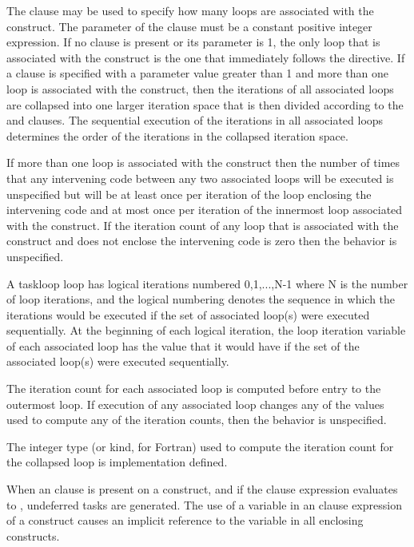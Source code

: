 The  clause may be used to specify how many loops are
associated with the  construct.  The parameter of the
 clause must be a constant positive integer
expression.  If no  clause is present or its parameter
is 1, the only loop that is associated with the 
construct is the one that immediately follows the 
directive.  If a  clause is specified with a parameter
value greater than 1 and more than one loop is associated with the
 construct, then the iterations of all associated loops
are collapsed into one larger iteration space that is then divided
according to the  and  clauses. The
sequential execution of the iterations in all associated loops
determines the order of the iterations in the collapsed iteration
space.

If more than one loop is associated with the  construct
then the number of times that any intervening code between any two
associated loops will be executed is unspecified but will be at least
once per iteration of the loop enclosing the intervening code and at
most once per iteration of the innermost loop associated with the
construct.  If the iteration count of any loop that is associated with the
 construct and does not enclose the intervening code is zero
then the behavior is unspecified.


A taskloop loop has logical iterations numbered 0,1,...,N-1 where N is
the number of loop iterations, and the logical numbering denotes the
sequence in which the iterations would be executed if the set of
associated loop(s) were executed sequentially.  At the beginning of
each logical iteration, the loop iteration variable of each associated
loop has the value that it would have if the set of the associated
loop(s) were executed sequentially.

The iteration count for each associated loop is computed before entry to the outermost loop. If execution of any associated loop changes any of the values used to compute any of the iteration counts, then the behavior is unspecified.

The integer type (or kind, for Fortran) used to compute the iteration count for the collapsed loop is implementation defined.

When an  clause is present on a  construct, and if the  clause expression evaluates to , undeferred tasks are generated. The use of a variable in an  clause expression of a  construct causes an implicit reference to the variable in all enclosing constructs.

